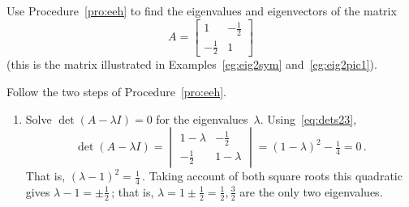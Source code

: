 \begin{example} \label{eg:2evals}
Use Procedure~\ref{pro:eeh} to find the eigenvalues and eigenvectors of the matrix
\begin{equation*}
A=\begin{bmatrix} 1&-\frac12\\-\frac12&1 \end{bmatrix}
\end{equation*}
(this is the matrix illustrated in Examples~\ref{eg:eig2sym} and~\ref{eg:eig2pic1}).
\begin{solution} Follow the two steps of Procedure~\ref{pro:eeh}.
\begin{enumerate}
\item Solve \(\det(A-\lambda I)=0\) for the eigenvalues~\(\lambda\).
Using~\eqref{eq:dets23},
\begin{equation*}
\det(A-\lambda I)=\begin{vmatrix} 1-\lambda&-\frac12\\
-\frac12&1-\lambda \end{vmatrix}
=(1-\lambda)^2-\tfrac14=0\,.
\end{equation*}
That is, \((\lambda-1)^2=\frac14\)\,.  Taking account of both square roots this quadratic gives \(\lambda-1=\pm\frac12\)\,; that is, \(\lambda=1\pm\frac12=\frac12,\frac32\) are the only two eigenvalues.


\end{enumerate}
\end{solution}
\end{example}
